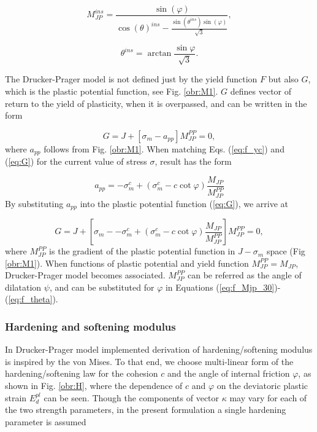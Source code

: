 \begin{equation}\label{eq:f_Mjp_i}
	M_{JP}^{ins} = \dfrac{\sin(\varphi)}{\cos(\theta)^{ins}-\frac{\sin(\theta^{ins})\sin(\varphi)}{\sqrt{3}}},
\end{equation}

\begin{equation}\label{eq:f_theta}
	\theta^{ins} = \arctan{\frac{\sin{\varphi}}{\sqrt{3}}}.
\end{equation}

The Drucker-Prager model is not defined just by the yield function $F$ but also $G$, which is the plastic potential function, see Fig. \ref{obr:M1}. $G$ defines vector of return to the yield of plasticity, when it is overpassed, and can be written in the form 

\begin{equation}\label{eq:G}
	G = J + \left[ \sigma_m - a_{pp} \right] M_{JP}^{PP} = 0,
\end{equation}
where $a_{pp}$ follows from Fig. \ref{obr:M1}. When matching Eqs. (\ref{eq:f_yc}) and (\ref{eq:G}) for the current value of stress $\sigma$, result has the form

\begin{equation}\label{eq:app}
	a_{pp} = - \sigma_m^c + ( \sigma_m^c - c\cot\varphi) \dfrac{M_{JP}}{M_{JP}^{PP}}
\end{equation} 
By substituting $a_{pp}$ into the plastic potential function (\ref{eq:G}), we arrive at

\begin{equation}\label{eq:plastic_potential}
	G = J + \left[ \sigma_m - - \sigma_m^c + ( \sigma_m^c - c\cot\varphi) \dfrac{M_{JP}}{M_{JP}^{PP}} \right] M_{JP}^{PP} = 0,
\end{equation}
where $M_{JP}^{PP}$ is the gradient of the plastic potential function in $J-\sigma_m$ space (Fig \ref{obr:M1}). When functions of plastic potential and yield function  $M_{JP}^{PP}=M_{JP}$, Drucker-Prager model becomes associated. $M_{JP}^{PP}$  can be referred as the angle of dilatation $\psi$, and can be substituted for $\varphi$ in Equations (\ref{eq:f_Mjp_30})-(\ref{eq:f_theta}).
 
\subsubsection{Hardening and softening modulus}
\indent

 In Drucker-Prager model implemented derivation of hardening/softening modulus is inspired by the von Mises. To that end, we choose multi-linear form of the hardening/softening law for the cohesion $c$ and the angle of internal friction $\varphi$, as shown in Fig. \ref{obr:H}, where the dependence of $c$ and $\varphi$ on the deviatoric plastic strain $E_d^{pl}$ can be seen. Though the components of vector $\kappa$ may vary for each of the two strength parameters, in the present formulation a single hardening parameter is assumed 
 
